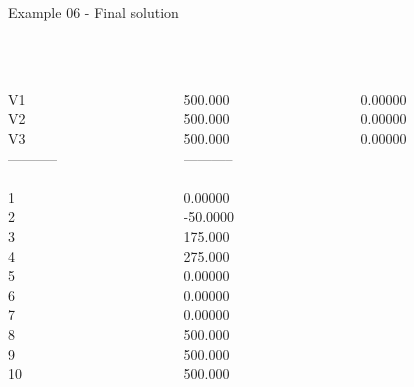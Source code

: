 \begin{frame}{Example 06 - Final solution}
\footnotesize
{} \\
  \\

\begin{columns}[t]
\begin{column}{0.3\textwidth}
\\
V1\\
V2\\
V3\\
-----------\\
\\
1\\
2\\
3\\
4\\
5\\
6\\
7\\
8\\
9\\
10\\

\end{column}
\begin{column}{0.3\textwidth}
\\
500.000\\
500.000\\
500.000\\
-----------\\
\\
0.00000\\
-50.0000\\
175.000\\
275.000\\
0.00000\\
0.00000\\
0.00000\\
500.000\\
500.000\\
500.000\\
\end{column}  

\begin{column}{0.3\textwidth}
\\
0.00000\\
0.00000\\
0.00000\\


\end{column}
\end{columns}
\end{frame}
